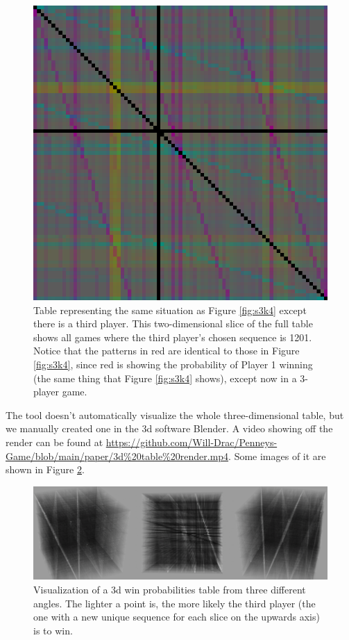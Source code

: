 \documentclass[english,12pt,a4paper,final]{article}
\begin{document}
\begin{figure} [H]
	\centering
	\includegraphics[width=0.7\linewidth]{"s3k4 3p"}
	\caption{Table representing the same situation as Figure \ref{fig:s3k4} except there is a third player. This two-dimensional slice of the full table shows all games where the third player's chosen sequence is 1201. Notice that the patterns in red are identical to those in Figure \ref{fig:s3k4}, since red is showing the probability of Player 1 winning (the same thing that Figure \ref{fig:s3k4} shows), except now in a 3-player game.}
	\label{fig:s3k4-3p}
\end{figure}

The tool doesn't automatically visualize the whole three-dimensional table, but we manually created one in the 3d software Blender. A video showing off the render can be found at \href{https://github.com/Will-Drac/Penneys-Game/blob/main/paper/3d%20table%20render.mp4}{https://github.com/Will-Drac/Penneys-Game/blob/main/paper/3d\%20table\%20render.mp4}. Some images of it are shown in Figure \ref{fig:3d}.

\begin{figure} [H]
	\centering
	\includegraphics[width=0.9\linewidth]{3d}
	\caption{Visualization of a 3d win probabilities table from three different angles. The lighter a point is, the more likely the third player (the one with a new unique sequence for each slice on the upwards axis) is to win.}
	\label{fig:3d}
\end{figure}
\end{document}
